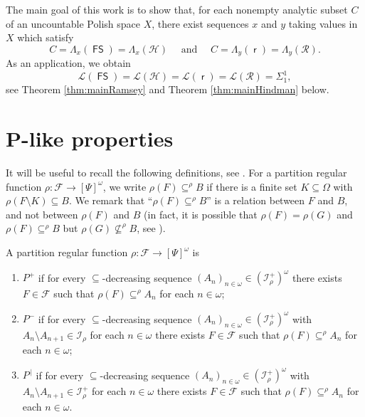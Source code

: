 \documentclass{amsart}
\theoremstyle{plain}
\theoremstyle{definition}
\theoremstyle{remark}
\newcommand{\cF}{\mathcal{F}}
\newcommand{\cI}{\mathcal{I}}
\newcommand{\I}{\cI}
\DeclareMathOperator{\FS}{\mathsf{FS}}
\DeclareMathOperator{\rr}{\mathsf{r}}
\begin{document}
The main goal of this work is to show that, for each nonempty analytic subset $C$ of an uncountable Polish space $X$, there exist sequences $x$ and $y$ 
taking values in $X$ which satisfy 
\begin{equation*}
C=\Lambda_{x}(\FS)=\Lambda_x({\mathcal{H}}) 
\quad \text{ and }\quad  
C=\Lambda_{y}(\rr)=\Lambda_y({\mathcal{R}}).
\end{equation*}
As an application, we obtain 
\begin{equation*}
\mathscr{L}(\FS)=\mathscr{L}(\mathcal{H})=
\mathscr{L}(\rr)=\mathscr{L}(\mathcal{R})=
\Sigma^1_1,
\end{equation*}
see Theorem \ref{thm:mainRamsey} and Theorem \ref{thm:mainHindman} below. 


\section{P-like properties}\label{sec:Plike}

It will be useful to recall the following definitions, see
\cite[Section 6]{FKK23}. 
For a partition regular function
$\rho:\cF\to[\Psi]^\omega$, we write 
$\rho(F)\subseteq^\rho B$
if there is a finite set $K\subseteq \Omega$ with $\rho(F\setminus K)\subseteq B$.
We remark that 
``$\rho(F)\subseteq^\rho B$'' 
is a relation between $F$ and $B$, and not between $\rho(F)$ and $B$ (in fact, it is possible that $\rho(F)=\rho(G)$ and $\rho(F)\subseteq^\rho B$ but $\rho(G)\not\subseteq^\rho B$, see \cite[Remark after Definition 6.3]{FKK23}).   

A partition regular function $\rho: \mathcal{F}\to [\Psi]^\omega$ is
\begin{enumerate}[label={\rm (\roman{*})}]
\item 
\emph{$P^+$} if for every $\subseteq$-decreasing sequence $(A_n)_{n\in\omega}\in (\I_{\rho}^+)^\omega$  
there exists $F\in\cF$ such that $\rho(F)\subseteq^\rho A_n$
for each $n\in\omega$;
\item 
\emph{$P^-$} if for every $\subseteq$-decreasing sequence $(A_n)_{n\in\omega}\in (\I_{\rho}^+)^\omega$ with $A_n\setminus A_{n+1}\in \I_{\rho}$ for each $n\in\omega$ 
there exists $F\in\cF$ such that $\rho(F)\subseteq^\rho A_n$
for each $n\in\omega$;
\item 
\emph{$P^{\,|}$} if for every $\subseteq$-decreasing sequence $(A_n)_{n\in\omega}\in (\I_{\rho}^+)^\omega$ with $A_n\setminus A_{n+1}\in \I_{\rho}^+$ for each $n\in\omega$ 
there exists $F\in\cF$ such that $\rho(F)\subseteq^\rho A_n$
for each $n\in\omega$.
\end{enumerate}
\end{document}
